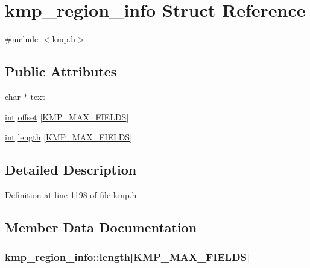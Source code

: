 \hypertarget{structkmp__region__info}{\section{kmp\-\_\-region\-\_\-info Struct Reference}
\label{structkmp__region__info}
}


{\ttfamily \#include $<$kmp.\-h$>$}

\subsection*{Public Attributes}
\begin{DoxyCompactItemize}
\item 
char $\ast$ \hyperlink{structkmp__region__info_a3b54581bfc8441186a8247bc62402621}{text}
\item 
\hyperlink{ittnotify__static_8h_a8b8dcd723308a8cb5d84277c7a3fff70}{int} \hyperlink{structkmp__region__info_a96bdcd59666e72a9f364182fb92817b4}{offset} \mbox{[}\hyperlink{kmp_8h_a7e7c1f9dc3279e10bf49f6ebcb81ce8e}{K\-M\-P\-\_\-\-M\-A\-X\-\_\-\-F\-I\-E\-L\-D\-S}\mbox{]}
\item 
\hyperlink{ittnotify__static_8h_a8b8dcd723308a8cb5d84277c7a3fff70}{int} \hyperlink{structkmp__region__info_a332d969da39e10cac2e4fb4b03388a64}{length} \mbox{[}\hyperlink{kmp_8h_a7e7c1f9dc3279e10bf49f6ebcb81ce8e}{K\-M\-P\-\_\-\-M\-A\-X\-\_\-\-F\-I\-E\-L\-D\-S}\mbox{]}
\end{DoxyCompactItemize}


\subsection{Detailed Description}


Definition at line 1198 of file kmp.\-h.



\subsection{Member Data Documentation}
\hypertarget{structkmp__region__info_a332d969da39e10cac2e4fb4b03388a64}{
\subsubsection[{length}]{ kmp\-\_\-region\-\_\-info\-::length\mbox{[}{\bf K\-M\-P\-\_\-\-M\-A\-X\-\_\-\-F\-I\-E\-L\-D\-S}\mbox{]}}}\label{structkmp__region__info_a332d969da39e10cac2e4fb4b03388a64}


